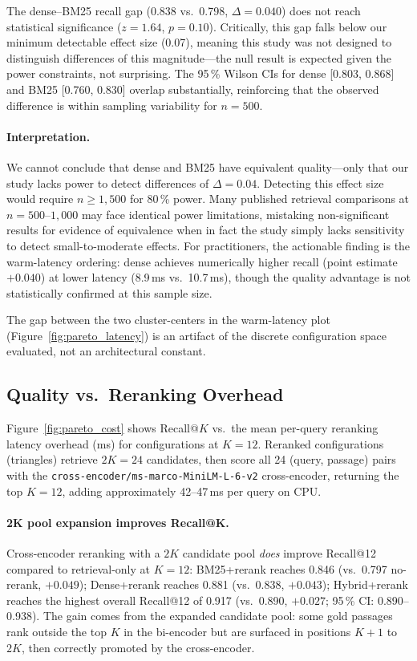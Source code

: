 \documentclass[11pt,a4paper]{article}
\begin{document}
The dense--BM25 recall gap (0.838 vs.\ 0.798, $\Delta = 0.040$) does not
reach statistical significance ($z = 1.64$, $p = 0.10$).
Critically, this gap falls below our minimum detectable effect size (0.07),
meaning this study was not designed to distinguish differences of this
magnitude---the null result is expected given the power constraints, not
surprising.
The 95\,\% Wilson CIs for dense [0.803, 0.868] and BM25 [0.760, 0.830]
overlap substantially, reinforcing that the observed difference is within
sampling variability for $n = 500$.

\paragraph{Interpretation.}
We cannot conclude that dense and BM25 have equivalent quality---only that
our study lacks power to detect differences of $\Delta = 0.04$.
Detecting this effect size would require $n \geq 1{,}500$ for 80\,\% power.
Many published retrieval comparisons at $n = 500$--$1{,}000$ may face
identical power limitations, mistaking non-significant results for evidence
of equivalence when in fact the study simply lacks sensitivity to detect
small-to-moderate effects.
For practitioners, the actionable finding is the warm-latency ordering: dense
achieves numerically higher recall (point estimate $+0.040$) at lower latency
(8.9\,ms vs.\ 10.7\,ms), though the quality advantage is not statistically
confirmed at this sample size.

The gap between the two cluster-centers in the warm-latency plot
(Figure~\ref{fig:pareto_latency}) is an artifact of the discrete configuration
space evaluated, not an architectural constant.

\subsection{Quality vs.\ Reranking Overhead}
\label{sec:results_cost}

Figure~\ref{fig:pareto_cost} shows Recall@$K$ vs.\ the mean per-query
reranking latency overhead (ms) for configurations at $K=12$.
Reranked configurations (triangles) retrieve $2K=24$ candidates, then score
all 24 (query, passage) pairs with the
\texttt{cross-encoder/ms-marco-MiniLM-L-6-v2} cross-encoder, returning the
top $K=12$, adding approximately 42--47\,ms per query on CPU.

\paragraph{2K pool expansion improves Recall@K.}
Cross-encoder reranking with a $2K$ candidate pool \emph{does} improve
Recall@12 compared to retrieval-only at $K=12$:
BM25+rerank reaches 0.846 (vs.\ 0.797 no-rerank, $+0.049$);
Dense+rerank reaches 0.881 (vs.\ 0.838, $+0.043$);
Hybrid+rerank reaches the highest overall Recall@12 of 0.917
(vs.\ 0.890, $+0.027$; 95\,\% CI: 0.890--0.938).
The gain comes from the expanded candidate pool: some gold passages rank
outside the top $K$ in the bi-encoder but are surfaced in positions $K+1$
to $2K$, then correctly promoted by the cross-encoder.
\end{document}
